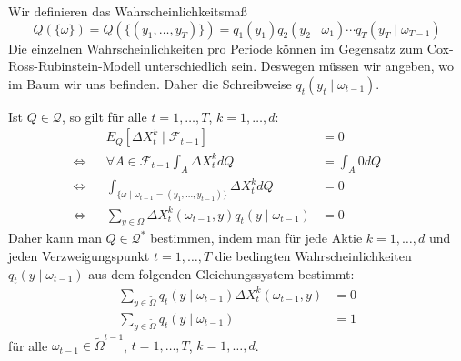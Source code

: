 \documentclass[a4paper,twoside,DIV15,BCOR12mm]{scrbook}
\newcommand{\cF}{\mathcal F}
\newcommand{\cQ}{\mathcal Q}
\begin{document}
Wir definieren das Wahrscheinlichkeitsmaß 
\[
Q(\{\omega\}) = Q(\{(y_1,\ldots,y_T)\}) = q_1(y_1) q_2(y_2\mid \omega_1) \cdots q_T(y_T\mid \omega_{T-1})
\]
Die einzelnen Wahrscheinlichkeiten pro Periode können im Gegensatz zum Cox-Ross-Rubinstein-Modell unterschiedlich sein. Deswegen müssen wir angeben, wo im Baum wir uns befinden. Daher die Schreibweise $q_t(y_t\mid \omega_{t-1})$. 

Ist $Q\in\cQ$, so gilt für alle $t=1,\ldots,T$, $k=1,\ldots,d$:
\begin{align*}
&& E_Q[\Delta X_t^k\mid \cF_{t-1}] &= 0 \\
\iff && \forall A \in \cF_{t-1} \int_A \Delta X_t^kdQ &= \int_A 0 dQ  && \\
\iff && \int_{\{\omega \mid \omega_{t-1} = (y_1,\ldots,y_{t-1})\}}
\Delta X_t^k dQ &= 0\\
\iff && \sum_{y\in\tilde\Omega} \Delta X_t^k(\omega_{t-1}, y) q_t(y\mid \omega_{t-1}) &= 0
\end{align*}
Daher kann man $Q\in \cQ^*$ bestimmen, indem man für jede Aktie $k=1,\ldots,d$ und jeden Verzweigungspunkt $t=1,\ldots,T$ die bedingten Wahrscheinlichkeiten $q_t(y\mid \omega_{t-1})$ aus dem folgenden Gleichungssystem bestimmt:
\begin{align*}
\sum_{y\in\tilde\Omega} q_t(y\mid \omega_{t-1}) \Delta X_t^k (\omega_{t-1},y) &= 0 \\
\sum_{y\in\tilde\Omega} q_t(y \mid \omega_{t-1}) &= 1
\end{align*}
für alle $\omega_{t-1}\in \tilde\Omega^{t-1}$, $t=1,\ldots,T$, $k=1,\ldots,d$.
\end{document}
